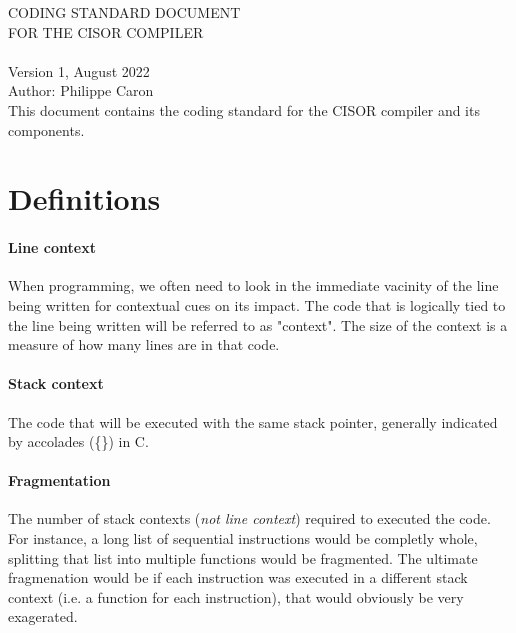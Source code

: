 \documentclass{article}
\begin{document}
\begin{center}
  \vspace*{0.5in}
  {\Huge CODING STANDARD DOCUMENT}\\
  \vspace{1em}
  {\Large FOR THE CISOR COMPILER}\\
  \vspace{10em}
  \\
  \vspace{10em}
  {\Large Version 1, August 2022}\\
  \vspace{1em}
  {\large Author: Philippe Caron}\\
  \vspace{2em}
  This document contains the coding standard for the CISOR compiler and its components.
\end{center}
\pagebreak

\tableofcontents

\pagebreak

\section{Definitions}
\paragraph{Line context} When programming, we often need to look in the immediate vacinity of the line being written for contextual cues on its impact. The code that is logically tied to the line being written will be referred to as "context". The size of the context is a measure of how many lines are in that code.

\paragraph{Stack context} The code that will be executed with the same stack pointer, generally indicated by accolades ({\{\}}) in C.

\paragraph{Fragmentation} The number of stack contexts (\textit{not line context}) required to executed the code. For instance, a long list of sequential instructions would be completly whole, splitting that list into multiple functions would be fragmented. The ultimate fragmenation would be if each instruction was executed in a different stack context (i.e. a function for each instruction), that would obviously be very exagerated.
\end{document}
